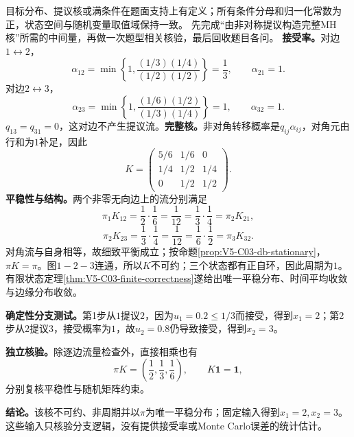 \label{struct:V5-C03-CH33}
\begin{solution}
\SolGiven 目标分布、提议核或满条件在题面支持上有定义；所有条件分母和归一化常数为正，状态空间与随机变量取值域保持一致。
\SolPlan 先完成“由非对称提议构造完整MH核”所需的中间量，再做一次题型相关核验，最后回收题目各问。
\SolDerive
\textbf{接受率。}对边$1\leftrightarrow2$，
\[
\alpha_{12}
=\min\left\{1,\frac{(1/3)(1/4)}{(1/2)(1/2)}\right\}
=\frac13,
\qquad
\alpha_{21}=1.
\]
对边$2\leftrightarrow3$，
\[
\alpha_{23}
=\min\left\{1,\frac{(1/6)(1/2)}{(1/3)(1/4)}\right\}=1,
\qquad
\alpha_{32}=1.
\]
$q_{13}=q_{31}=0$，这对边不产生提议流。\textbf{完整核。}非对角转移概率是$q_{ij}\alpha_{ij}$，对角元由行和为$1$补足，因此
\[
K=\begin{pmatrix}
5/6&1/6&0\\
1/4&1/2&1/4\\
0&1/2&1/2
\end{pmatrix}.
\]
\textbf{平稳性与结构。}两个非零无向边上的流分别满足
\[
\pi_1K_{12}=\frac12\cdot\frac16=\frac1{12}
=\frac13\cdot\frac14=\pi_2K_{21},
\]
\[
\pi_2K_{23}=\frac13\cdot\frac14=\frac1{12}
=\frac16\cdot\frac12=\pi_3K_{32}.
\]
对角流与自身相等，故细致平衡成立；按命题\ref{prop:V5-C03-db-stationary}，$\pi K=\pi$。图$1-2-3$连通，所以$K$不可约；三个状态都有正自环，因此周期为$1$。有限状态定理\ref{thm:V5-C03-finite-correctness}遂给出唯一平稳分布、时间平均收敛与边缘分布收敛。

\textbf{确定性分支测试。}第1步从$1$提议$2$，因为$u_1=0.2\le1/3$而接受，得到$x_1=2$；第2步从$2$提议$3$，接受概率为$1$，故$u_2=0.8$仍导致接受，得到$x_2=3$。

\textbf{独立核验。}除逐边流量检查外，直接相乘也有
\[
\pi K=\left(\frac12,\frac13,\frac16\right),
\qquad K\boldsymbol1=\boldsymbol1,
\]
分别复核平稳性与随机矩阵约束。

\textbf{结论。}该核不可约、非周期并以$\pi$为唯一平稳分布；固定输入得到$x_1=2,x_2=3$。这些输入只核验分支逻辑，没有提供接受率或Monte Carlo误差的统计估计。
\end{solution}

\label{struct:V5-C03-CH34}

